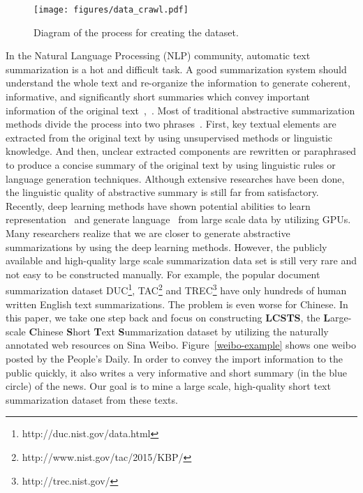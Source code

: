 \documentclass[11pt,a4paper]{article}
\begin{document}
\begin{figure*}[!tb]
\centering
\texttt{[image: figures/data\_crawl.pdf]}
\vspace{-10pt}
\caption{Diagram of the process for creating the dataset.}
\label{abc}
\vspace{-10pt}
\end{figure*}

In the Natural Language Processing (NLP) community, automatic text summarization is a hot and difficult task. A good summarization system should understand the whole text and re-organize the information to generate coherent, informative, and significantly short summaries which convey important information of the original text~\cite{hovy1998},~\cite{survey_2007}. Most of traditional abstractive summarization methods  divide the process into two phrases~\cite{lidong}. First, key textual elements are extracted from the original text by using unsupervised methods or linguistic knowledge. And then, unclear extracted components are rewritten or paraphrased to produce a concise summary of the original text by using linguistic rules or language generation techniques. Although extensive researches have been done, the linguistic quality of abstractive summary is still far from satisfactory. Recently, deep learning methods have shown potential abilities to learn representation~\cite{my_nips2014,my_acl2015} and generate language~\cite{groundhog,google} from large scale data by utilizing GPUs. Many researchers realize that we are closer to generate abstractive summarizations by using the deep learning methods. However, the publicly available and high-quality large scale summarization data set is still very rare and not easy to be constructed manually. For example, the popular document summarization dataset DUC\footnote{http://duc.nist.gov/data.html}, TAC\footnote{http://www.nist.gov/tac/2015/KBP/} and TREC\footnote{http://trec.nist.gov/} have only hundreds of human written English text summarizations. The problem is even worse for Chinese. In this paper, we take one step back and focus on constructing \textbf{LCSTS}, the \textbf{L}arge-scale \textbf{C}hinese \textbf{S}hort \textbf{T}ext \textbf{S}ummarization dataset by utilizing the naturally annotated web resources on Sina Weibo. Figure~\ref{weibo-example} shows one weibo posted by the People's Daily. In order to convey the import information to the public quickly, it also writes a very informative and short summary (in the blue circle) of the news. Our goal is to mine a large scale, high-quality short text summarization dataset from these texts.
\end{document}

